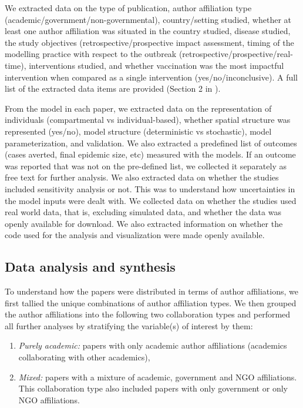 \documentclass[10pt,letterpaper]{article}
\begin{document}
We extracted data on the type of publication, author affiliation type (academic/government/non-governmental), country/setting studied, whether at least one author affiliation was situated in the country studied, disease studied, the study objectives (retrospective/prospective impact assessment, timing of the modelling practice with respect to the outbreak (retrospective/prospective/real-time), interventions studied, and whether vaccination was the most impactful intervention when compared as a single intervention (yes/no/inconclusive). A full list of the extracted data items are provided (Section 2 in ).  

From the model in each paper, we extracted data on the representation of individuals (compartmental vs individual-based), whether spatial structure was represented (yes/no), model structure (deterministic vs stochastic), model parameterization, and validation. We also extracted a predefined list of outcomes (cases averted, final epidemic size, etc) measured with the models. If an outcome was reported that was not on the pre-defined list, we collected it separately as free text for further analysis. We also extracted data on whether the studies included sensitivity analysis or not. This was to understand how uncertainties in the model inputs were dealt with.  We collected data on whether the studies used real world data, that is, excluding simulated data, and whether the data was openly available for download. We also extracted information on whether the code used for the analysis and visualization were made openly available.


\subsection*{Data analysis and synthesis}
To understand how the papers were distributed in terms of author affiliations, we first tallied the unique combinations of author affiliation types. We then grouped the author affiliations into the following two collaboration types and performed all further analyses by stratifying the variable(s) of interest by them:

\begin{enumerate}
	\item \textit{Purely academic:} papers with only academic author affiliations (academics collaborating with other academics), 
	\item \textit{Mixed:} papers with a mixture of academic, government and NGO affiliations. This collaboration type also included papers with only government or only NGO affiliations. 
\end{enumerate}
\end{document}
